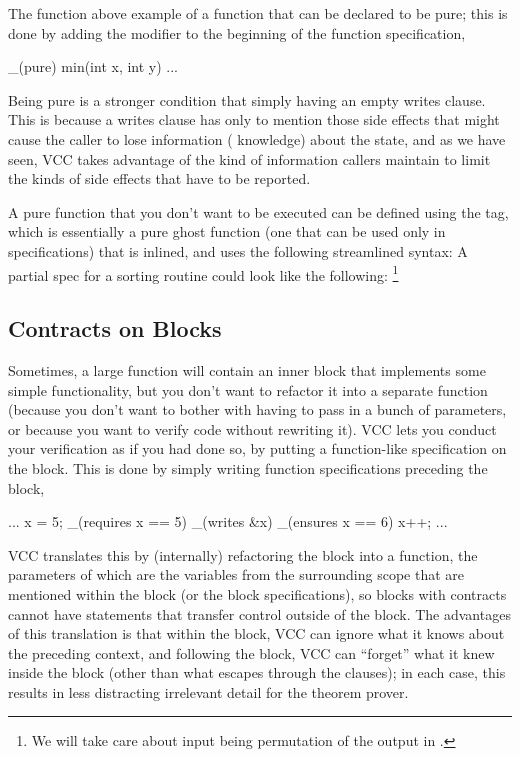 The function  above
example of a function that can be declared to be pure; this is done by
adding the modifier  to the beginning of the function specification,
\eg
\begin{VCC}
_(pure) min(int x, int y) ...
\end{VCC}

Being pure is a stronger condition that simply having an empty writes
clause. This is because a writes clause has only to mention those side
effects that might cause the caller to lose information (\ie
knowledge) about the state, and as we have seen, VCC takes advantage
of the kind of information callers maintain to limit the kinds of side
effects that have to be reported.

A pure function that you don't want to be executed can be defined
using the  tag, which is essentially a pure ghost function
(one that can be used only in specifications) that is inlined, and
uses the following streamlined syntax:
\noindent
A partial spec for a sorting routine could look like the following:%
\footnote{We will take care about input being permutation of the output in .}


\subsection{Contracts on Blocks} 

Sometimes, a large function will contain an inner block that
implements some simple functionality, but you don't want to refactor
it into a separate function (\eg because you don't want to bother with
having to pass in a bunch of parameters, or because you want to verify
code without rewriting it). VCC lets you conduct your verification as
if you had done so, by putting a function-like specification on the
block. This is done by simply writing function specifications
preceding the block, \eg
\begin{VCC}
...
x = 5;
_(requires x == 5)
_(writes &x)
_(ensures x == 6)
{
  x++;
}
...
\end{VCC}
VCC translates this by (internally) refactoring the block into a
function, the parameters of which are the variables from the
surrounding scope that are mentioned within the block (or the block
specifications), so blocks with contracts cannot have statements that
transfer control outside of the block. The advantages of this
translation is that within the block, VCC can ignore what it knows
about the preceding context, and following the block, VCC can
``forget'' what it knew inside the block (other than what escapes
through the  clauses); in each case, this results in less
distracting irrelevant detail for the theorem prover.


